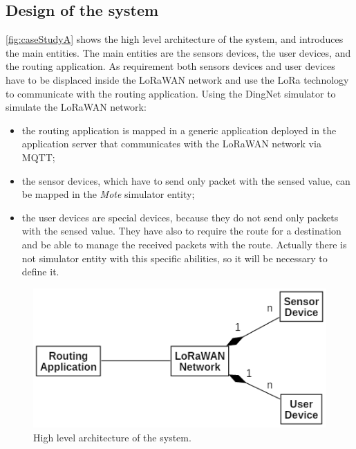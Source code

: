 \subsection{Design of the system}
\autoref{fig:caseStudyA} shows the high level architecture of the system, and introduces the main entities. 
The main entities are the sensors devices, the user devices, and the routing application.
As requirement both sensors devices and user devices have to be displaced inside the LoRaWAN network and use the LoRa technology to communicate with the routing application.
Using the DingNet simulator to simulate the LoRaWAN network:
\begin{itemize}
    \item the routing application is mapped in a generic application deployed in the application server that communicates with the LoRaWAN network via MQTT;
    \item the sensor devices, which have to send only packet with the sensed value, can be mapped in the \textit{Mote} simulator entity;
    \item the user devices are special devices, because they do not send only packets with the sensed value. They have also to require the route for a destination and be able to manage the received packets with the route. Actually there is not simulator entity with this specific abilities, so it will be necessary to define it.
\end{itemize}
% 
\begin{figure}[h]
    \centering
    \includegraphics{figures/CaseStudyA_HLarch.png}
    \caption[High level architecture of the system (case study 1)]{High level architecture of the system.}
    \label{fig:caseStudyA}
\end{figure}
% 

